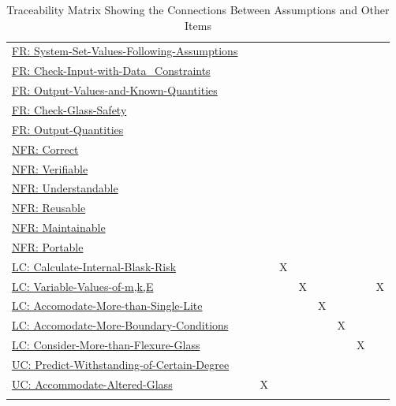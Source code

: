 \documentclass[12pt]{article}
\begin{document}
\begin{longtable}{l l l l l l l l l}
\\
\hyperref[sysSetValsFollowingAssumps]{FR: System-Set-Values-Following-Assumptions} &  &  &  &  &  &  &  & 
\\
\hyperref[checkInputWithDataCons]{FR: Check-Input-with-Data\_Constraints} &  &  &  &  &  &  &  & 
\\
\hyperref[outputValsAndKnownQuants]{FR: Output-Values-and-Known-Quantities} &  &  &  &  &  &  &  & 
\\
\hyperref[checkGlassSafety]{FR: Check-Glass-Safety} &  &  &  &  &  &  &  & 
\\
\hyperref[outputQuants]{FR: Output-Quantities} &  &  &  &  &  &  &  & 
\\
\hyperref[correct]{NFR: Correct} &  &  &  &  &  &  &  & 
\\
\hyperref[verifiable]{NFR: Verifiable} &  &  &  &  &  &  &  & 
\\
\hyperref[understandable]{NFR: Understandable} &  &  &  &  &  &  &  & 
\\
\hyperref[reusable]{NFR: Reusable} &  &  &  &  &  &  &  & 
\\
\hyperref[maintainable]{NFR: Maintainable} &  &  &  &  &  &  &  & 
\\
\hyperref[portable]{NFR: Portable} &  &  &  &  &  &  &  & 
\\
\hyperref[calcInternalBlastRisk]{LC: Calculate-Internal-Blask-Risk} &  &  & X &  &  &  &  & 
\\
\hyperref[varValsOfmkE]{LC: Variable-Values-of-m,k,E} &  &  &  & X &  &  &  & X
\\
\hyperref[accMoreThanSingleLite]{LC: Accomodate-More-than-Single-Lite} &  &  &  &  & X &  &  & 
\\
\hyperref[accMoreBoundaryConditions]{LC: Accomodate-More-Boundary-Conditions} &  &  &  &  &  & X &  & 
\\
\hyperref[considerMoreThanFlexGlass]{LC: Consider-More-than-Flexure-Glass} &  &  &  &  &  &  & X & 
\\
\hyperref[predictWithstandOfCertDeg]{UC: Predict-Withstanding-of-Certain-Degree} &  &  &  &  &  &  &  & 
\\
\hyperref[accAlteredGlass]{UC: Accommodate-Altered-Glass} &  & X &  &  &  &  &  & 
\\
\bottomrule
\caption{Traceability Matrix Showing the Connections Between Assumptions and Other Items}
\label{Table:TraceMatAvsAll}
\end{longtable}
\end{document}
